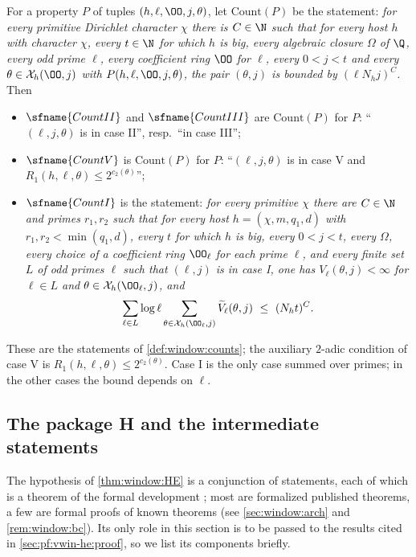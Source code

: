 \begin{definition}\label{pf:vwin-he:countdef}
For a property $P$ of tuples $(h,\ell,\OO,j,\theta)$, let $\mathrm{Count}(P)$ be the statement: \emph{for every
primitive Dirichlet character $\chi$ there is $C\in\N$ such that for every host $h$ with character $\chi$, every
$t\in\N$ for which $h$ is big, every algebraic closure $\Omega$ of $\Q$, every odd prime $\ell$, every coefficient
ring $\OO$ for $\ell$, every $0<j<t$ and every $\theta\in\vwinheX_h(\OO,j)$ with $P(h,\ell,\OO,j,\theta)$, the pair
$(\theta,j)$ is bounded by $(\ell N_hj)^C$.} Then
\begin{itemize}
\item $\sfname{CountII}$ and $\sfname{CountIII}$ are $\mathrm{Count}(P)$ for $P$: ``$(\ell,j,\theta)$ is in
case II'', resp.\ ``in case III'';
\item $\sfname{CountV}$ is $\mathrm{Count}(P)$ for $P$: ``$(\ell,j,\theta)$ is in case V and
$R_1(h,\ell,\theta)\le2^{c_2(\theta)}$'';
\item $\sfname{CountI}$ is the statement: \emph{for every primitive $\chi$ there are $C\in\N$ and primes $r_1,r_2$
such that for every host $h=(\chi,m,q_1,d)$ with $r_1,r_2<\min(q_1,d)$, every $t$ for which $h$ is big, every
$0<j<t$, every $\Omega$, every choice of a coefficient ring $\OO_\ell$ for each prime $\ell$, and every finite set
$L$ of odd primes $\ell$ such that $(\ell,j)$ is in case I, one has $V_\ell(\theta,j)<\infty$ for $\ell\in L$ and
$\theta\in\vwinheX_h(\OO_\ell,j)$, and}
\[
 \sum_{\ell\in L}\log\ell\sum_{\theta\in\vwinheX_h(\OO_\ell,j)}\vwinheVt_\ell(\theta,j)\ \le\ (N_ht)^C .
\]
\end{itemize}
\end{definition}

These are the statements of \cref{def:window:counts}; the auxiliary $2$-adic condition of case V is
$R_1(h,\ell,\theta)\le2^{c_2(\theta)}$. Case I is the only case summed over primes; in the other cases the bound
depends on $\ell$.

\subsection{The package H and the intermediate statements}\label{sec:pf:vwin-he:hyps}

The hypothesis of \cref{thm:window:HE} is a conjunction of statements, each of which is a theorem of the formal
development \cite{LeanSource2026}; most are formalized published theorems, a few are formal proofs of known
theorems (see \cref{sec:window:arch} and \cref{rem:window:bc}). Its only role in this section is to be passed to
the results cited in \cref{sec:pf:vwin-he:proof}, so we list its components briefly.

